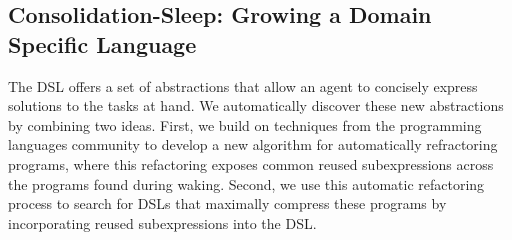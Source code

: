 \documentclass{article}
\begin{document}




\subsection{Consolidation-Sleep: Growing a Domain Specific Language}\label{consolidationSection}

The DSL offers a set of abstractions that allow an agent to concisely
express solutions to the tasks at hand. We automatically discover
these new abstractions by combining two ideas. First, we build on
techniques from the programming languages community to develop a new
algorithm for automatically refractoring programs, where this
refactoring exposes common reused subexpressions across the
programs found during waking.  Second, we use this automatic refactoring
process to search for DSLs that maximally compress these programs by
incorporating reused subexpressions into the DSL.
\end{document}
